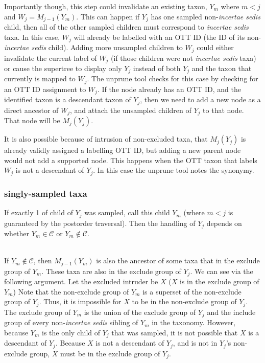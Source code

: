 \documentclass[english]{article}
\newcommand{\incsed}[0]{{\em incertae sedis}\xspace}
\begin{document}
Importantly though, this step could invalidate an existing taxon, $Y_m$ where $m < j$ and $W_j = M_{j-1}(Y_m)$.
This can happen if $Y_j$ has one sampled non-\incsed child, then all of the other sampled children must correspond to \incsed taxa.
In this case, $W_j$ will already be labelled with an OTT ID (the ID of its non-\incsed child).
Adding more unsampled children to $W_j$ could either invalidate the current label of
    $W_j$ (if those children were not \incsed taxa) or cause the supertree
    to display only $Y_j$ instead of both $Y_j$ and the taxon that currently is mapped to $W_j$.
The unprune tool checks for this case by checking for an OTT ID assignment to $W_j$.
If the node already has an OTT ID, and the identified taxon is a descendant taxon of $Y_j$, 
then we need to add a new node as a direct ancestor of $W_j$, and attach the unsampled 
children of $Y_j$ to that node.
That node will be $M_j(Y_j)$.

It is also possible because of intrusion of non-excluded taxa, that $M_j(Y_j)$ is already 
validly assigned a labelling OTT ID, but adding a new parent node would not add a supported
node.
This happens when the OTT taxon that labels $W_j$ is not a descendant of $Y_j$.
In this case the unprune tool notes the synonymy.



\subsubsection{singly-sampled taxa}
If exactly 1 of child of $Y_j$ was sampled, call this child $Y_m$ (where $m < j$ 
    is guaranteed by the postorder traversal).
Then the handling of $Y_j$ depends on 
    whether $Y_m\in\mathcal{C}$ or $Y_m\notin\mathcal{C}$.

\\
If $Y_m\notin\mathcal{C}$, then $M_{j-1}(Y_m)$ is also the ancestor
    of some taxa that in the exclude group of $Y_m$.
These taxa are also in the exclude group of $Y_j$.
We can see via the following argument.
Let the excluded intruder be $X$ ($X$ is in the exclude group of $Y_m$)
Note that the non-exclude group of $Y_m$ is a superset of the non-exclude group
    of $Y_j$.
Thus, it is impossible for $X$ to be in the non-exclude group of $Y_j$.
The exclude group of $Y_m$ is the union of the exclude group of $Y_j$ and the include
    group of every non-\incsed sibling of $Y_m$ in the taxonomy.
However, because $Y_m$ is the only child of $Y_j$ that was sampled, it is 
    not possible that $X$ is a descendant of $Y_j$.
Because $X$ is not a descendant of $Y_j$, and is not in $Y_j$'s non-exclude group,
    $X$ must be in the exclude group of $Y_j$.
\end{document}
